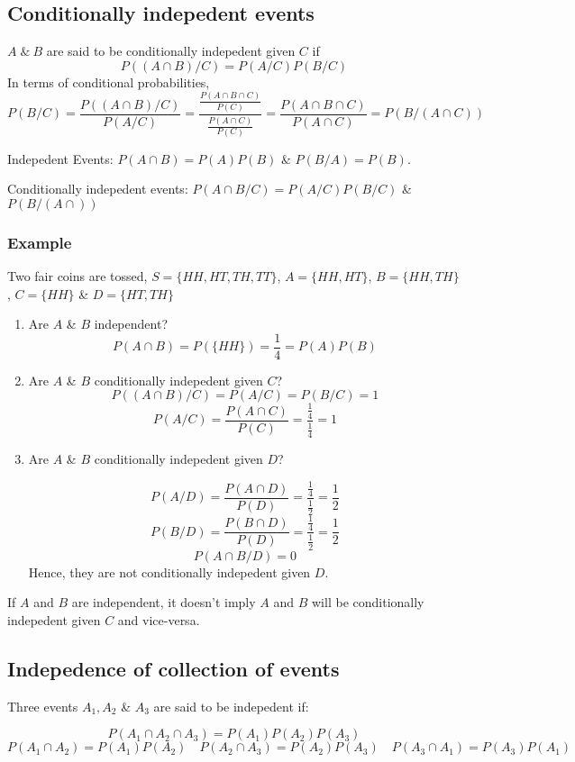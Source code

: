 \documentclass{article}
\begin{document}
\subsection{Conditionally indepedent events}

$A \; \& \: B$ are said to be conditionally indepedent given $C$ if
$$ P((A \cap B)/ C)= P(A/C)P(B/C)$$
In terms of conditional probabilities,
$$ P(B/C)= \frac{P((A\cap B )/ C)}{P(A/C)}= \frac{\frac{P(A \cap B \cap C)}{P(C)}}{\frac{P(A \cap C)}{P(C)}} = \frac{P(A\cap B\cap C)}{P(A \cap C)} = P(B/(A \cap C))$$

Indepedent Events: $P(A \cap B)= P(A)P(B)$ \& $P(B/A)= P(B)$.

Conditionally indepedent events: $P(A\cap B / C)= P(A/C)P(B/C)$ \& $P(B/(A\cap ))$

\subsubsection{Example}
Two fair coins are tossed, $S=\{HH, HT, TH, TT \}$, $A=\{HH, HT \} $, $B=\{HH, TH\} $, $C=\{HH \}$ \& $D=\{HT, TH\}$

\begin{enumerate}
    \item Are $A$ \& $B$ independent?
    $$ P(A \cap B)= P(\{HH\}) = \frac{1}{4}= P(A)P(B)$$
    \item  Are $A$ \& $B$ conditionally indepedent given $C$?
    $$ P((A \cap B) /C)= P(A/C)=P(B/C)= 1$$
    $$ P(A/C)= \frac{P(A \cap C)}{P(C)}= \frac{\frac{1}{4}}{\frac{1}{4}}= 1$$
    \item Are $A$ \& $B$ conditionally indepedent given $D$?

    $$P(A/D)= \frac{P(A\cap D)}{P(D)}= \frac{\frac{1}{4}}{\frac{1}{2}}=\frac{1}{2} $$
    $$P(B/D)= \frac{P(B\cap D)}{P(D)}= \frac{\frac{1}{4}}{\frac{1}{2}}=\frac{1}{2} $$
    $$ P(A\cap B /D)= 0$$
    Hence, they are not conditionally indepedent given $D$.
\end{enumerate}

If $A$ and $B$ are independent, it doesn't imply $A$ and $B$ will be conditionally indepedent given $C$ and vice-versa.
\subsection{Indepedence of collection of events}

Three events $A_1, A_2$ \& $A_3$ are said to be indepedent if:

$$ P(A_1 \cap A_2 \cap A_3)=P(A_1)P(A_2)P(A_3)$$
$$ P(A_1 \cap A_2)=P(A_1)P(A_2)\quad P(A_2 \cap A_3)=P(A_2)P(A_3)\quad P(A_3 \cap A_1)=P(A_3)P(A_1)$$
\end{document}
